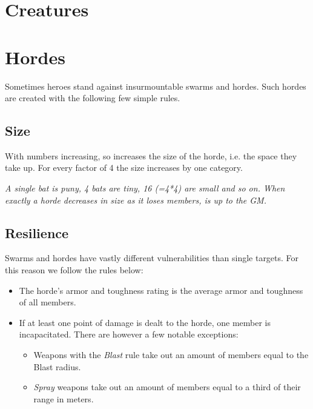 \documentclass[12pt,a4paper,openany]{book}
\begin{document}
	\vspace{5mm}
	

	\pagebreak

	\section{Creatures}
	

	\pagebreak
	\section{Hordes}
	Sometimes heroes stand against insurmountable swarms and hordes. Such hordes are created with the following few simple rules.
	
	\subsection*{Size}
	With numbers increasing, so increases the size of the horde, i.e. the space they take up. For every factor of 4 the size increases by one category.
	\begin{exampleblock}
		\itshape A single bat is puny, 4 bats are tiny, 16 (=4*4) are small and so on.
		When exactly a horde decreases in size as it loses members, is up to the GM.
	\end{exampleblock}
	
	\subsection*{Resilience}
	Swarms and hordes have vastly different vulnerabilities than single targets. For this reason we follow the rules below:
	\begin{itemize}
		\setlength\itemsep{-8mm} \vspace{-8mm}
		\item The horde's armor and toughness rating is the average armor and toughness of all members.
		\item If at least one point of damage is dealt to the horde, one member is incapacitated. There are however a few notable exceptions:
			\begin{itemize}
				\setlength\itemsep{-8mm} \vspace{-8mm}
				\item Weapons with the \emph{Blast} rule take out an amount of members equal to the Blast radius.
				\item \emph{Spray} weapons take out an amount of members equal to a third of their range in meters.
			\end{itemize}
	\end{itemize}
	
\end{document}
